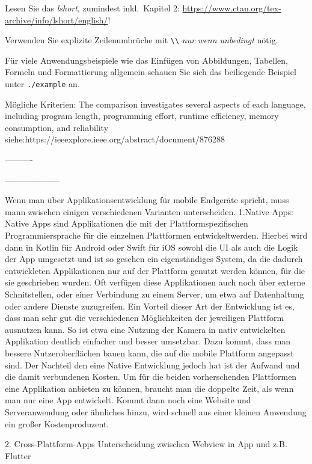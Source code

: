 
Lesen Sie das \emph{lshort}, zumindest inkl.\ Kapitel 2: \url{https://www.ctan.org/tex-archive/info/lshort/english/}!

Verwenden Sie explizite Zeilenumbrüche mit \lstinline[language=Tex]!\\! \emph{nur wenn unbedingt} nötig.

Für viele Anwendungsbeispiele wie das Einfügen von Abbildungen, Tabellen, Formeln und Formattierung allgemein schauen Sie sich das beiliegende Beispiel unter \texttt{./example} an.


Mögliche Kriterien:
The comparison investigates several aspects of each language, including program length, programming effort, runtime efficiency, memory consumption, and reliability
siehe:https://ieeexplore.ieee.org/abstract/document/876288

----------



--------------------

Wenn man über Applikationsentwicklung für mobile Endgeräte spricht, muss mann zwischen einigen verschiedenen Varianten unterscheiden.
1.Native Apps:
Native Apps sind Applikationen die mit der Plattformspezifischen Programmiersprache für die einzelnen Plattformen entwickeltwerden. Hierbei wird dann in Kotlin für Android oder Swift für iOS sowohl die UI als auch die Logik der App umgesetzt und ist so gesehen ein eigenständiges System, da die dadurch entwickleten Applikationen nur auf der Plattform genutzt werden können, für die sie geschrieben wurden.
Oft verfügen diese Applikationen auch noch über externe Schnitstellen, oder einer Verbindung zu einem Server, um etwa auf Datenhaltung oder andere Dienste zuzugreifen.
Ein Vorteil dieser Art der Entwicklung ist es, dass man sehr gut die verschiedenen Möglichkeiten der jeweiligen Plattform ausnutzen kann. So ist etwa eine Nutzung der Kamera in nativ entwickelten Applikation deutlich einfacher und besser umsetzbar. Dazu kommt, dass man bessere Nutzeroberflächen bauen kann, die auf die mobile Plattform angepasst sind.
Der Nachteil den eine Native Entwicklung jedoch hat ist der Aufwand und die damit verbundenen Kosten. Um für die beiden vorherschenden Plattformen eine Applikation anbieten zu können, braucht man die doppelte Zeit, als wenn man nur eine App entwickelt. Kommt dann noch eine Website und Serveranwendung oder ähnliches hinzu, wird schnell aus einer kleinen Anwendung ein großer Kostenproduzent.

2. Cross-Plattform-Apps
Unterscheidung zwischen Webview in App und z.B. Flutter 


